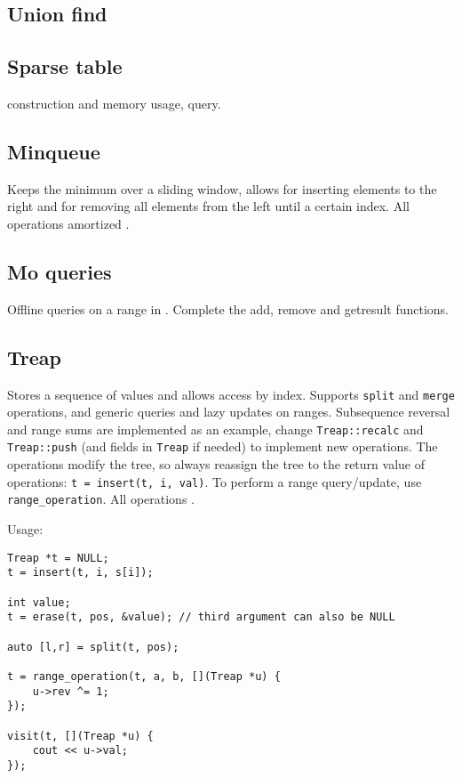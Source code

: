 \subsection{Union find}


\subsection{Sparse table}
 construction and memory usage,  query.


\subsection{Minqueue}
Keeps the minimum over a sliding window, allows for inserting elements to the right and for removing all elements from the left until a certain index. All operations amortized .


\subsection{Mo queries}
Offline queries on a range in . Complete the add, remove and getresult functions.


\subsection{Treap}

Stores a sequence of values and allows access by index. Supports \texttt{split} and \texttt{merge} operations, and generic queries and lazy updates on ranges. Subsequence reversal and range sums are implemented as an example, change \texttt{Treap::recalc} and \texttt{Treap::push} (and fields in \texttt{Treap} if needed) to implement new operations.
The operations modify the tree, so always reassign the tree to the return value of operations: \texttt{t = insert(t, i, val)}. To perform a range query/update, use \texttt{range\_operation}.
All operations .

Usage:
\begin{lstlisting}
Treap *t = NULL;
t = insert(t, i, s[i]);

int value;
t = erase(t, pos, &value); // third argument can also be NULL

auto [l,r] = split(t, pos);

t = range_operation(t, a, b, [](Treap *u) {
	u->rev ^= 1;
});

visit(t, [](Treap *u) {
	cout << u->val;
});
\end{lstlisting}

